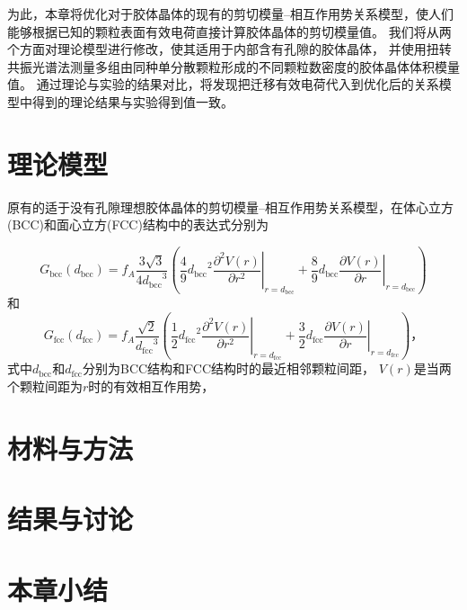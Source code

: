 为此，本章将优化对于胶体晶体的现有的剪切模量--相互作用势关系模型，使人们能够根据已知的颗粒表面有效电荷直接计算胶体晶体的剪切模量值。
我们将从两个方面对理论模型进行修改，使其适用于内部含有孔隙的胶体晶体，
并使用扭转共振光谱法测量多组由同种单分散颗粒形成的不同颗粒数密度的胶体晶体体积模量值。
通过理论与实验的结果对比，将发现把迁移有效电荷代入到优化后的关系模型中得到的理论结果与实验得到值一致。

\section{理论模型}

原有的适于没有孔隙理想胶体晶体的剪切模量--相互作用势关系模型，在体心立方(BCC)和面心立方(FCC)结构中的表达式分别为

\begin{equation}
	G_{\text{bcc}}\left(d_\text{bcc}\right)={f_A}\frac{3\sqrt{3}}{4{d_\text{bcc}}^3}
	\left(\frac{4}{9}{d_\text{bcc}}^2\left.\frac{\partial^2V(r)}{\partial r^2}\right|_{r=d_\text{bcc}}
	+\frac{8}{9}d_\text{bcc}\left.\frac{\partial V(r)}{\partial r}\right|_{r=d_\text{bcc}}\right)
\end{equation}
和
\begin{equation}
	G_{\text{fcc}}\left(d_\text{fcc}\right)={f_A}\frac{\sqrt{2}}{{d_\text{fcc}}^3}
\left(\frac{1}{2}{d_\text{fcc}}^2\left.\frac{\partial^2V(r)}{\partial r^2}\right|_{r=d_\text{fcc}}
+\frac{3}{2}d_\text{fcc}\left.\frac{\partial V(r)}{\partial r}\right|_{r=d_\text{fcc}}\right)\text{，}
\end{equation}
式中$d_\text{bcc}$和$d_\text{fcc}$分别为BCC结构和FCC结构时的最近相邻颗粒间距，
$V(r)$是当两个颗粒间距为$r$时的有效相互作用势，


\section{材料与方法}
\section{结果与讨论}
\section{本章小结}